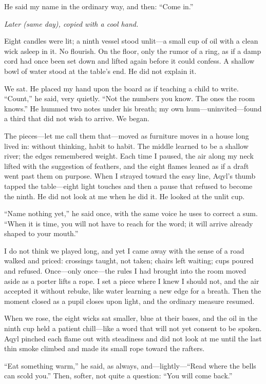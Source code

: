 \documentclass[11pt]{article}
\begin{document}
He said my name in the ordinary way, and then: “Come in.”

\medskip
\noindent\textit{Later (same day), copied with a cool hand.}

Eight candles were lit; a ninth vessel stood unlit—a small cup of oil with a clean wick asleep in it. No flourish. On the floor, only the rumor of a ring, as if a damp cord had once been set down and lifted again before it could confess. A shallow bowl of water stood at the table’s end. He did not explain it.

We sat. He placed my hand upon the board as if teaching a child to write. “Count,” he said, very quietly. “Not the numbers you know. The ones the room knows.” He hummed two notes under his breath; my own hum—uninvited—found a third that did not wish to arrive. We began.

The pieces—let me call them that—moved as furniture moves in a house long lived in: without thinking, habit to habit. The middle learned to be a shallow river; the edges remembered weight. Each time I paused, the air along my neck lifted with the suggestion of feathers, and the eight flames leaned as if a draft went past them on purpose. When I strayed toward the easy line, Aqyl’s thumb tapped the table—eight light touches and then a pause that refused to become the ninth. He did not look at me when he did it. He looked at the unlit cup.

“Name nothing yet,” he said once, with the same voice he uses to correct a sum. “When it is time, you will not have to reach for the word; it will arrive already shaped to your mouth.”

I do not think we played long, and yet I came away with the sense of a road walked and priced: crossings taught, not taken; chairs left waiting; cups poured and refused. Once—only once—the rules I had brought into the room moved aside as a porter lifts a rope. I set a piece where I knew I should not, and the air accepted it without rebuke, like water learning a new edge for a breath. Then the moment closed as a pupil closes upon light, and the ordinary measure resumed.

When we rose, the eight wicks sat smaller, blue at their bases, and the oil in the ninth cup held a patient chill—like a word that will not yet consent to be spoken. Aqyl pinched each flame out with steadiness and did not look at me until the last thin smoke climbed and made its small rope toward the rafters.

“Eat something warm,” he said, as always, and—lightly—“Read where the bells can scold you.” Then, softer, not quite a question: “You will come back.”
\end{document}
